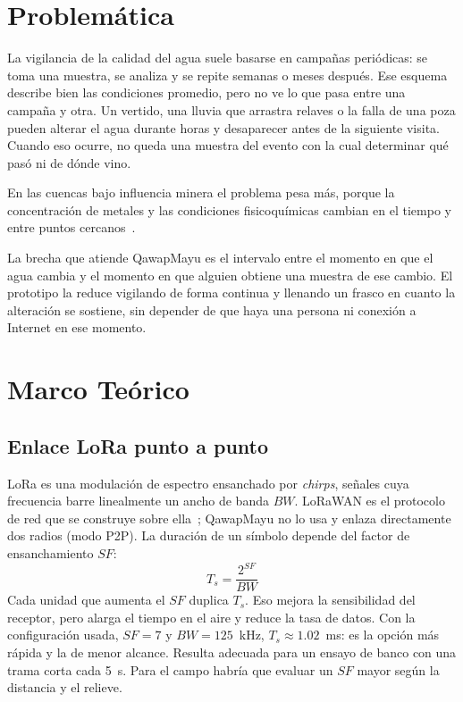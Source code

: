 \section{Problemática}
\label{sec:problematica}

La vigilancia de la calidad del agua suele basarse en campañas periódicas: se toma una muestra, se analiza y se repite semanas o meses después. Ese esquema describe bien las condiciones promedio, pero no ve lo que pasa entre una campaña y otra. Un vertido, una lluvia que arrastra relaves o la falla de una poza pueden alterar el agua durante horas y desaparecer antes de la siguiente visita. Cuando eso ocurre, no queda una muestra del evento con la cual determinar qué pasó ni de dónde vino.

En las cuencas bajo influencia minera el problema pesa más, porque la concentración de metales y las condiciones fisicoquímicas cambian en el tiempo y entre puntos cercanos~\cite{moreno2024,ocona2024}.

La brecha que atiende QawapMayu es el intervalo entre el momento en que el agua cambia y el momento en que alguien obtiene una muestra de ese cambio. El prototipo la reduce vigilando de forma continua y llenando un frasco en cuanto la alteración se sostiene, sin depender de que haya una persona ni conexión a Internet en ese momento.

\section{Marco Teórico}
\label{sec:marco}

\subsection{Enlace LoRa punto a punto}

LoRa es una modulación de espectro ensanchado por \textit{chirps}, señales cuya frecuencia barre linealmente un ancho de banda $BW$. LoRaWAN es el protocolo de red que se construye sobre ella~\cite{lora}; QawapMayu no lo usa y enlaza directamente dos radios (modo P2P). La duración de un símbolo depende del factor de ensanchamiento $SF$:
\begin{equation}
    T_s = \frac{2^{SF}}{BW}
\end{equation}
Cada unidad que aumenta el $SF$ duplica $T_s$. Eso mejora la sensibilidad del receptor, pero alarga el tiempo en el aire y reduce la tasa de datos. Con la configuración usada, $SF = 7$ y $BW = 125$~kHz, $T_s \approx 1.02$~ms: es la opción más rápida y la de menor alcance. Resulta adecuada para un ensayo de banco con una trama corta cada 5~s. Para el campo habría que evaluar un $SF$ mayor según la distancia y el relieve.

